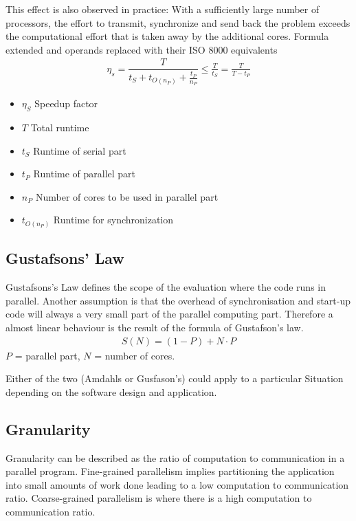 This effect is also observed in practice:
With a sufficiently large number of processors, the effort to transmit, synchronize and send back the problem exceeds the computational effort that is taken away by the additional cores.
Formula extended and operands replaced with their ISO 8000 equivalents
\begin{align*}
    \eta_s = \dfrac{T}{t_S + t_{O(n_P)} + \frac{t_P}{n_P}} \leq \frac{T}{t_S} = \frac{T}{T-t_P}
\end{align*}
\begin{multicols}{2}
    \begin{itemize}
        \item $\eta_S$ Speedup factor
        \item $T$ Total runtime
        \item $t_S$ Runtime of serial part
        \item $t_P$ Runtime of parallel part
        \item $n_P$ Number of cores to be used in parallel part
        \item $t_{O(n_P)}$ Runtime for synchronization
    \end{itemize}
\end{multicols}

\subsection{Gustafsons' Law}
Gustafsons's Law defines the scope of the evaluation where the code runs in parallel.
Another assumption is that the overhead of synchronisation and start-up code will always a very small part of the parallel computing part.
Therefore a almost linear behaviour is the result of the formula of Gustafson’s law.
\begin{align*}
    S(N) = (1-P) + N\cdot P
\end{align*}
$P$ = parallel part, $N$ = number of cores.

Either of the two (Amdahls or Gusfason's) could apply to a particular Situation depending on the software design and application.

\subsection{Granularity}
Granularity can be described as the ratio of computation to communication in a parallel program.
Fine-grained parallelism implies partitioning the application into small amounts of work done leading to a low computation to communication ratio.
Coarse-grained parallelism is where there is a high computation to communication ratio.


